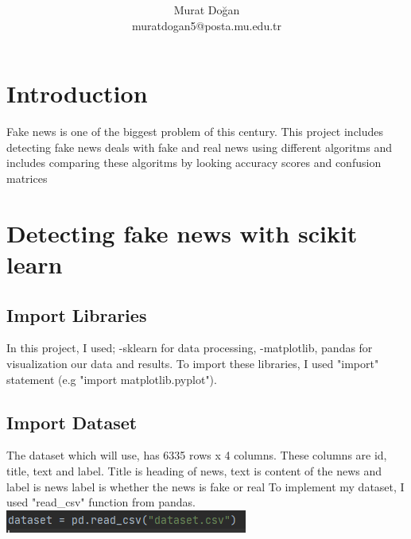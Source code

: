 \documentclass[onecolumn]{article}
\title{\spacecaps{Fake News Detection}\\ \normalsize \spacesc{using Scikit-Learn} }
\author{Murat Doğan\\muratdogan5@posta.mu.edu.tr}
\begin{document}
\maketitle

\section{Introduction}
Fake news is one of the biggest problem of this century. This project includes detecting fake news deals with fake and real news using different algoritms and includes comparing these algoritms by looking accuracy scores and confusion matrices

\section{Detecting fake news with scikit learn}


\subsection{Import Libraries}
In this project, I used;\newline
-sklearn for data processing,\newline
-matplotlib, pandas for visualization our data and results.\bigskip\newline
\noindent
To import these libraries, I used "import" statement (e.g "import matplotlib.pyplot").

\subsection{Import Dataset}
The dataset which will use, has 6335 rows x 4 columns. These columns are id, title, text and label. Title is heading of news, text is content of the news and label is news label is whether the news is fake or real\bigskip\newline
\noindent
To implement my dataset, I used "read\_csv" function from pandas.\bigskip\newline
\includegraphics{fig/d.PNG}
\end{document}

